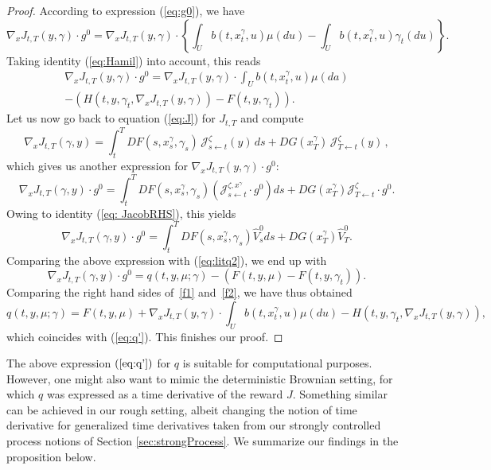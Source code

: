 \documentclass[12pt,reqno]{amsart}
\numberwithin{equation}{section}  %
\newcommand{\1}{{\bf 1}}
\newcommand{\2}{{\bf 2}}
\newcommand{\ga}{\gamma}
\newcommand{\lp}{\left(}
\newcommand{\rp}{\right)}
\theoremstyle{remark}
\theoremstyle{remark}
\begin{document}
\begin{proof}
    According to expression (\ref{eq:g0}), we have 
    \begin{equation} \label{eq:Jg-identity1}
        \nabla_{x}J_{t,T}(y,\ga)\cdot g^{0}=  \nabla_{x}J_{t,T}(y,\ga)\cdot \left\{\int_{U}b(t,x_{t}^{\ga},u)\mu(du)-\int_{U}b(t,x_{t}^{\ga},u)\ga_{t}(du)\right\} .
    \end{equation}
    Taking identity (\ref{eq:Hamil}) into account, this reads
    \begin{multline}\label{f1}
         \nabla_{x}J_{t,T}(y,\ga)\cdot g^{0} 
         = \nabla_{x}J_{t,T}(y,\ga)\cdot \int_{U}b(t,x_{t}^{\ga},u)\mu(da) \\
         -\lp H(t,y,\ga_t, \nabla_{x}J_{t,T}(y,\ga))-F(t,y,\ga_t) \rp.
    \end{multline}
    Let us now go back to equation (\ref{eq:J}) for $J_{t,T}$ and compute
    \[
    \nabla_{x}J_{t,T}(\ga,y)
    =\int_{t}^{T}DF(s,x_{s}^{\ga},\ga_{s})\, \mathcal{J}_{s\leftarrow t}^{\zeta}(y) \, ds
    +DG(x_{T}^{\ga}) \, \mathcal{J}_{T\leftarrow t}^{\zeta}(y) \, ,
    \]
    which gives us another expression for $\nabla_{x}J_{t,T}(y,\ga) \cdot g^{0}$:
    \begin{equation}\label{eq:Jg-identity2}
    \nabla_{x}J_{t,T}(\ga,y)\cdot g^{0}=\int_{t}^{T}DF(s,x_{s}^{\ga},\ga_{s})(\mathcal{J}_{s\leftarrow t}^{\zeta,x^{\ga}}\cdot g^{0})ds+DG(x_{T}^{\ga})\mathcal{J}_{T\leftarrow t}^{\zeta}\cdot g^{0}.
     \end{equation}
    Owing to identity (\ref{eq: JacobRHS}), this yields
    \[\nabla_{x}J_{t,T}(\ga,y)\cdot g^{0}=\int_{t}^{T}DF(s,x_{s}^{\ga},\ga_{s})\widehat{V}^{0}_{s}ds+DG(x_{T}^{\ga})\widehat{V}^{0}_{T}.\]
    Comparing the above expression with (\ref{eq:litq2}), we end up with
    \begin{equation}\label{f2}
    \nabla_{x}J_{t,T}(\ga,y)\cdot g^{0}=q(t,y,\mu;\ga)-\lp F(t,y,\mu)-F(t,y,\ga_{t}) \rp.
    \end{equation}
    Comparing the right hand sides of~\eqref{f1} and~\eqref{f2}, we have thus obtained
    \begin{equation*}
        q(t,y,\mu;\ga)=F(t,y,\mu)  +\nabla_{x}J_{t,T}(y,\ga)\cdot \int_{U}b(t,x_{t}^{\ga},u)\mu(du)-H(t,y,\ga_{t},\nabla_{x}J_{t,T}(y,\ga)),
    \end{equation*}
    which coincides with (\ref{eq:q'}). This finishes our proof.
\end{proof}
The above expression $(\ref{eq:q'})$ for $q$ is suitable for computational purposes. However, one might also want to mimic the deterministic Brownian setting, for which $q$ was expressed as a time derivative of the reward $J$. Something similar can be achieved in our rough setting, albeit changing the notion of time derivative for generalized time derivatives taken from our strongly controlled process notions of Section \ref{sec:strongProcess}. We summarize our findings in the proposition below.
\end{document}
